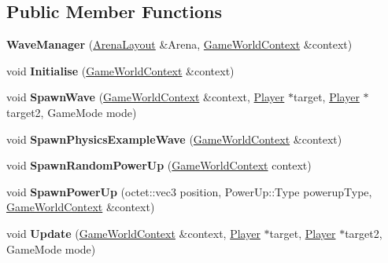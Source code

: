 \subsection*{Public Member Functions}
\begin{DoxyCompactItemize}
\item 
\hypertarget{class_arena_1_1_wave_manager_a4550eb024bbe46aff142297effeeee83}{{\bfseries Wave\+Manager} (\hyperlink{class_arena_1_1_arena_layout}{Arena\+Layout} \&Arena, \hyperlink{struct_arena_1_1_game_world_context}{Game\+World\+Context} \&context)}\label{class_arena_1_1_wave_manager_a4550eb024bbe46aff142297effeeee83}

\item 
\hypertarget{class_arena_1_1_wave_manager_a59bcd90555d0b5694953f63063b7b54b}{void {\bfseries Initialise} (\hyperlink{struct_arena_1_1_game_world_context}{Game\+World\+Context} \&context)}\label{class_arena_1_1_wave_manager_a59bcd90555d0b5694953f63063b7b54b}

\item 
\hypertarget{class_arena_1_1_wave_manager_ac8015608d609702008c9039eddcee047}{void {\bfseries Spawn\+Wave} (\hyperlink{struct_arena_1_1_game_world_context}{Game\+World\+Context} \&context, \hyperlink{class_arena_1_1_player}{Player} $\ast$target, \hyperlink{class_arena_1_1_player}{Player} $\ast$target2, Game\+Mode mode)}\label{class_arena_1_1_wave_manager_ac8015608d609702008c9039eddcee047}

\item 
\hypertarget{class_arena_1_1_wave_manager_ad80c0411190c519d0827481eb2b20eba}{void {\bfseries Spawn\+Physics\+Example\+Wave} (\hyperlink{struct_arena_1_1_game_world_context}{Game\+World\+Context} \&context)}\label{class_arena_1_1_wave_manager_ad80c0411190c519d0827481eb2b20eba}

\item 
\hypertarget{class_arena_1_1_wave_manager_aaf531cfbaff348cba8986e68fbad95e5}{void {\bfseries Spawn\+Random\+Power\+Up} (\hyperlink{struct_arena_1_1_game_world_context}{Game\+World\+Context} context)}\label{class_arena_1_1_wave_manager_aaf531cfbaff348cba8986e68fbad95e5}

\item 
\hypertarget{class_arena_1_1_wave_manager_a2363e33a0513b4f159e60a00f3a80c19}{void {\bfseries Spawn\+Power\+Up} (octet\+::vec3 position, Power\+Up\+::\+Type powerup\+Type, \hyperlink{struct_arena_1_1_game_world_context}{Game\+World\+Context} \&context)}\label{class_arena_1_1_wave_manager_a2363e33a0513b4f159e60a00f3a80c19}

\item 
\hypertarget{class_arena_1_1_wave_manager_ab1a1c80a3d308ac0cc70faa61ecec8e3}{void {\bfseries Update} (\hyperlink{struct_arena_1_1_game_world_context}{Game\+World\+Context} \&context, \hyperlink{class_arena_1_1_player}{Player} $\ast$target, \hyperlink{class_arena_1_1_player}{Player} $\ast$target2, Game\+Mode mode)}\label{class_arena_1_1_wave_manager_ab1a1c80a3d308ac0cc70faa61ecec8e3}

\end{DoxyCompactItemize}
